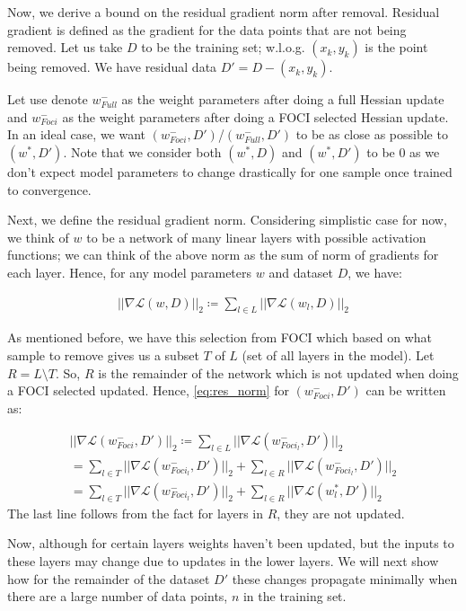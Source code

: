 Now, we derive a bound on the residual gradient norm after removal. Residual gradient is defined as the gradient for the data points that are not being removed. Let us take $D$ to be the training set; w.l.o.g. $(x_k, y_k)$ is the point being removed. We have residual data $D' = D - {(x_k, y_k)}$.

Let use denote $w^-_{Full}$ as the weight parameters after doing a full Hessian update and $w^-_{Foci}$ as the weight parameters after doing a FOCI selected Hessian update. In an ideal case, we want $(w^-_{Foci}, D')$/$(w^-_{Full}, D')$ to be as close as possible to $(w^*, D')$. Note that we consider both $(w^*, D)$ and $(w^*, D')$ to be $0$ as we don't expect model parameters to change drastically for one sample once trained to convergence. 

Next, we define the residual gradient norm. Considering simplistic case for now, we think of $w$ to be a network of many linear layers with possible activation functions; we can think of the above norm as the sum of norm of gradients for each layer. Hence, for any model parameters $w$ and dataset $D$, we have:

\begin{align}
    \label{eq:res_norm}
    ||\nabla \mathcal{L}(w,D)||_2 \coloneqq \sum_{l \in L} ||\nabla \mathcal{L}(w_l, D) ||_2
\end{align}

As mentioned before, we have this selection from FOCI which based on what sample to remove gives us a subset $T$ of $L$ (set of all layers in the model). Let $R = L \setminus T$. So, $R$ is the remainder of the network which is not updated when doing a FOCI selected updated. Hence, \ref{eq:res_norm} for $(w^-_{Foci}, D')$ can be written as:

\begin{align}
    \label{eq:foci_res_norm}
    ||\nabla \mathcal{L}(w^-_{Foci},D')||_2 \coloneqq \sum_{l \in L} ||\nabla \mathcal{L}(w^-_{Foci_l}, D') ||_2 \\
    = \sum_{l \in T} ||\nabla \mathcal{L}(w^-_{Foci_l}, D') ||_2 + \sum_{l \in R} ||\nabla \mathcal{L}(w^-_{Foci_l}, D') ||_2 \\
    = \sum_{l \in T} ||\nabla \mathcal{L}(w^-_{Foci_l}, D') ||_2 + \sum_{l \in R} ||\nabla \mathcal{L}(w^*_{l}, D') ||_2
\end{align}
The last line follows from the fact for layers in $R$, they are not updated.

Now, although for certain layers weights haven't been updated, but the inputs to these layers may change due to updates in the lower layers. We will next show how for the remainder of the dataset $D'$ these changes propagate minimally when there are a large number of data points, $n$ in the training set.

